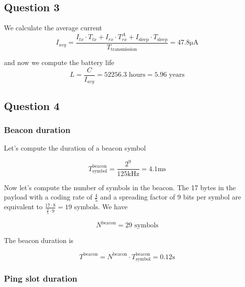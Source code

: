 \documentclass[]{article}
\begin{document}
	\subsection*{Question 3}
	
	We calculate the average current
	\begin{equation}
		I_{avg} = \frac{I_{tx} \cdot T_{tx} + I_{rx} \cdot T_{rx}^A + I_{\text{sleep}} \cdot T_{\text{sleep}}}{T_{\text{transmission}}} = 47.8 \mathrm{\mu A}
	\end{equation}
	
	and now we compute the battery life
	\begin{equation}
		L = \frac{C}{I_{avg}} = 52256.3 \text{ hours} = 5.96 \text{ years}
	\end{equation}
	
	\subsection*{Question 4}
	
	\subsubsection*{Beacon duration}
	
	Let's compute the duration of a beacon symbol
	
	\begin{equation}
		T_{\text{symbol}}^{\text{beacon}} = \frac{2^{9}}{125\text{kHz}} = 4.1\text{ms}
	\end{equation}
	
	Now let's compute the number of symbols in the beacon. The 17 bytes in the payload with a coding rate of $\frac{4}{5}$ and a spreading factor of 9 bits per symbol are equivalent to $\frac{17 \cdot 8}{\frac{4}{5} \cdot 9} = 19$ symbols. We have
	
	\begin{equation}
		N^{\text{beacon}} = 29\text{ symbols}
	\end{equation}
	
	The beacon duration is 
	
	\begin{equation}
		T^{\text{beacon}} = N^{\text{beacon}} \cdot T_{\text{symbol}}^{\text{beacon}} = 0.12\text{s}
	\end{equation}
	
	\subsubsection*{Ping slot duration}
	
\end{document}
